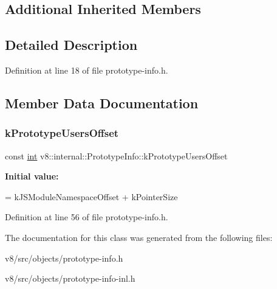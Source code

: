 \subsection*{Additional Inherited Members}


\subsection{Detailed Description}


Definition at line 18 of file prototype-\/info.\+h.



\subsection{Member Data Documentation}
\mbox{\label{classv8_1_1internal_1_1PrototypeInfo_a1302870eab35b0cb5109d42b26903526}} 
\subsubsection{\texorpdfstring{k\+Prototype\+Users\+Offset}{kPrototypeUsersOffset}}
{\footnotesize\ttfamily const \mbox{\hyperlink{classint}{int}} v8\+::internal\+::\+Prototype\+Info\+::k\+Prototype\+Users\+Offset\hspace{0.3cm}{\ttfamily [static]}}

{\bfseries Initial value\+:}
\begin{DoxyCode}
=
      kJSModuleNamespaceOffset + kPointerSize
\end{DoxyCode}


Definition at line 56 of file prototype-\/info.\+h.



The documentation for this class was generated from the following files\+:\begin{DoxyCompactItemize}
\item 
v8/src/objects/prototype-\/info.\+h\item 
v8/src/objects/prototype-\/info-\/inl.\+h\end{DoxyCompactItemize}
